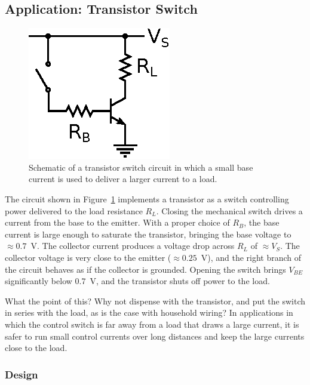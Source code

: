 \documentclass[11pt]{article}
\begin{document}
\subsection{Application: Transistor Switch}
\label{sec:transistorswitch}

\begin{figure}[ht]
  \begin{center}
    \includegraphics{transistorswitch.eps}
    \caption{Schematic of a transistor switch circuit in which a small
      base current is used to deliver a larger current to a load.}
    \label{fig:transistorswitch}
  \end{center}
\end{figure}

The circuit shown in Figure~\ref{fig:transistorswitch} implements a
transistor as a switch controlling power delivered to the load
resistance $R_L$.  Closing the mechanical switch drives a current from
the base to the emitter.  With a proper choice of $R_B$, the base
current is large enough to saturate the transistor, bringing the base
voltage to $\approx0.7$~V.  The collector current produces a voltage
drop across $R_L$ of $\approx V_S$. The collector voltage is very
close to the emitter ($\approx 0.25$~V), and the right branch of the
circuit behaves as if the collector is grounded. Opening the switch
brings $V_{BE}$ significantly below 0.7~V, and the transistor shuts
off power to the load.

What the point of this? Why not dispense with the transistor, and put
the switch in series with the load, as is the case with household
wiring? In applications in which the control switch is far away from a
load that draws a large current, it is safer to run small control
currents over long distances and keep the large currents close to the
load.

\subsubsection*{Design}
\end{document}
